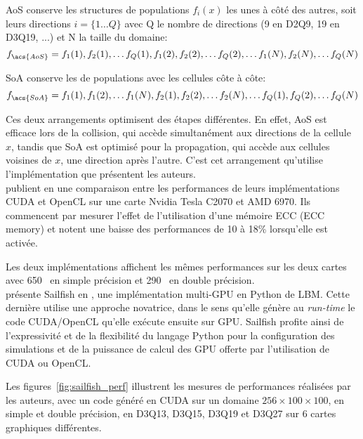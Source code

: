 \acs{AoS} conserve les structures de populations $f_i(x)$ les unes à côté des autres, soit leurs directions $i = \{1\dots Q\}$ avec Q le nombre de directions (9 en D2Q9, 19 en D3Q19, ...) et N la taille du domaine:
\begin{equation*}
f_{\acs{AoS}} = f_1(1), f_2(1), \dots f_Q(1), f_1(2), f_2(2), \dots f_Q(2), \dots f_1(N), f_2(N), \dots f_Q(N)
\end{equation*}

\acs{SoA} conserve les  de populations avec les cellules côte à côte:
\begin{equation*}
f_{\acs{SoA}} = f_1(1), f_1(2), \dots f_1(N), f_2(1), f_2(2), \dots f_2(N), \dots f_Q(1), f_Q(2), \dots f_Q(N)
\end{equation*}

Ces deux arrangements optimisent des étapes différentes. En effet, \acs{AoS} est efficace lors de la collision, qui accède simultanément aux directions de la cellule $x$, tandis que \acs{SoA} est optimisé pour la propagation, qui accède aux cellules voisines de $x$, une direction après l'autre. C'est cet arrangement qu'utilise l'implémentation que présentent les auteurs.\\

\citet{habich_performance_2013} publient en \citeyear{habich_performance_2013} une comparaison entre les performances de leurs implémentations CUDA et OpenCL sur une carte Nvidia Tesla C2070 et AMD 6970. Ils commencent par mesurer l'effet de l'utilisation d'une mémoire \acs{ECC} (\acl{ECC} memory) et notent une baisse des performances de 10 à 18\% lorsqu'elle est activée.

Les deux implémentations affichent les mêmes performances sur les deux cartes avec 650~ en simple précision et 290~ en double précision.\\

\citet{januszewski_sailfish_2014} présente Sailfish en \citeyear{januszewski_sailfish_2014}, une implémentation multi-\acs{GPU} en Python de \acs{LBM}. Cette dernière utilise une approche novatrice, dans le sens qu'elle génère au \textit{run-time} le code CUDA/OpenCL qu'elle exécute ensuite sur \acs{GPU}. Sailfish profite ainsi de l'expressivité et de la flexibilité du langage Python pour la configuration des simulations et de la puissance de calcul des \acs{GPU} offerte par l'utilisation de CUDA ou OpenCL.

Les figures~\ref{fig:sailfish_perf} illustrent les mesures de performances réalisées par les auteurs, avec un code généré en CUDA sur un domaine $256 \times 100\times 100$, en simple et double précision, en D3Q13, D3Q15, D3Q19 et D3Q27 sur 6 cartes graphiques différentes.

